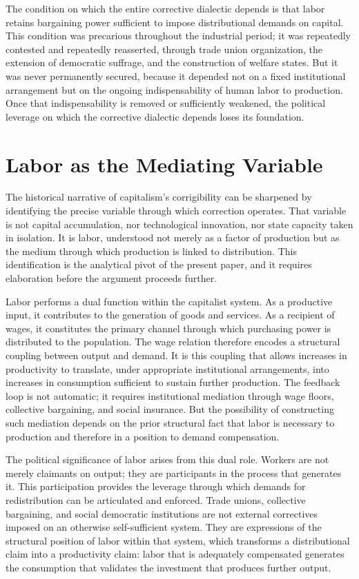 \documentclass[11pt, a4paper]{article}
\theoremstyle{plain}
\theoremstyle{definition}
\begin{document}
The condition on which the entire corrective dialectic depends is that labor
retains bargaining power sufficient to impose distributional demands on
capital. This condition was precarious throughout the industrial period; it
was repeatedly contested and repeatedly reasserted, through trade union
organization, the extension of democratic suffrage, and the construction of
welfare states. But it was never permanently secured, because it depended not
on a fixed institutional arrangement but on the ongoing indispensability of
human labor to production. Once that indispensability is removed or
sufficiently weakened, the political leverage on which the corrective dialectic
depends loses its foundation.

\section{Labor as the Mediating Variable}

The historical narrative of capitalism's corrigibility can be sharpened by
identifying the precise variable through which correction operates. That
variable is not capital accumulation, nor technological innovation, nor state
capacity taken in isolation. It is labor, understood not merely as a factor
of production but as the medium through which production is linked to
distribution. This identification is the analytical pivot of the present paper,
and it requires elaboration before the argument proceeds further.

Labor performs a dual function within the capitalist system. As a productive
input, it contributes to the generation of goods and services. As a recipient
of wages, it constitutes the primary channel through which purchasing power is
distributed to the population. The wage relation therefore encodes a structural
coupling between output and demand. It is this coupling that allows increases
in productivity to translate, under appropriate institutional arrangements,
into increases in consumption sufficient to sustain further production. The
feedback loop is not automatic; it requires institutional mediation through
wage floors, collective bargaining, and social insurance. But the possibility
of constructing such mediation depends on the prior structural fact that labor
is necessary to production and therefore in a position to demand compensation.

The political significance of labor arises from this dual role. Workers are
not merely claimants on output; they are participants in the process that
generates it. This participation provides the leverage through which demands
for redistribution can be articulated and enforced. Trade unions, collective
bargaining, and social democratic institutions are not external correctives
imposed on an otherwise self-sufficient system. They are expressions of the
structural position of labor within that system, which transforms a
distributional claim into a productivity claim: labor that is adequately
compensated generates the consumption that validates the investment that
produces further output.
\end{document}

